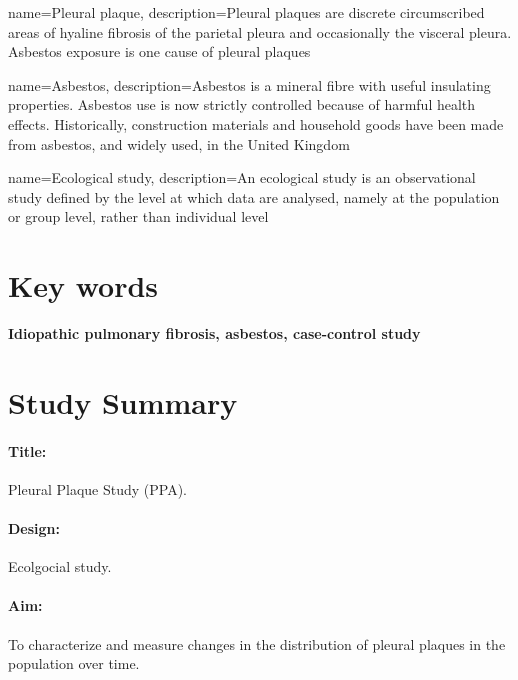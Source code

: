 \documentclass[a4paper,10pt]{article}
\begin{document}
\newpage
 
\tableofcontents

\newpage

  {name=Pleural plaque,
   description={Pleural plaques are discrete circumscribed areas of hyaline fibrosis of the parietal pleura and occasionally the visceral pleura. Asbestos exposure is one cause of pleural plaques}}

  {name=Asbestos,
   description={Asbestos is a mineral fibre with useful insulating properties. Asbestos use is now strictly controlled because of harmful health effects. Historically, construction materials and household goods have been made from asbestos, and widely used, in the United Kingdom}}

  {name=Ecological study,
  description={An ecological study is an observational study defined by the level at which data are analysed, namely at the population or group level, rather than individual level}}


\glsaddall

\printglossary[nonumberlist]

\section*{Key words}

\textbf{Idiopathic pulmonary fibrosis, asbestos, case-control study}

\newpage

\section*{Study Summary}

\paragraph{Title:} Pleural Plaque Study (PPA).
\paragraph{Design:} Ecolgocial study.
\paragraph{Aim:} To characterize and measure changes in the distribution of pleural plaques in the population over time.
\end{document}
